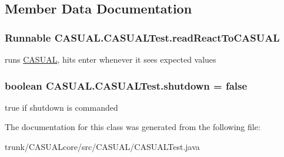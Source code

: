 \subsection{Member Data Documentation}
\hypertarget{class_c_a_s_u_a_l_1_1_c_a_s_u_a_l_test_a96c1d034054c2e980ed6e32da5ac04f5}{
\subsubsection[{read\-React\-To\-C\-A\-S\-U\-A\-L}]{\setlength{\rightskip}{0pt plus 5cm}Runnable C\-A\-S\-U\-A\-L.\-C\-A\-S\-U\-A\-L\-Test.\-read\-React\-To\-C\-A\-S\-U\-A\-L}}\label{class_c_a_s_u_a_l_1_1_c_a_s_u_a_l_test_a96c1d034054c2e980ed6e32da5ac04f5}
runs \hyperlink{namespace_c_a_s_u_a_l}{C\-A\-S\-U\-A\-L}, hits enter whenever it sees expected values \hypertarget{class_c_a_s_u_a_l_1_1_c_a_s_u_a_l_test_a3d022b59ea55fa0e2282e38fbd3eb102}{
\subsubsection[{shutdown}]{\setlength{\rightskip}{0pt plus 5cm}boolean C\-A\-S\-U\-A\-L.\-C\-A\-S\-U\-A\-L\-Test.\-shutdown = false\hspace{0.3cm}{\ttfamily [static]}}}\label{class_c_a_s_u_a_l_1_1_c_a_s_u_a_l_test_a3d022b59ea55fa0e2282e38fbd3eb102}
true if shutdown is commanded 

The documentation for this class was generated from the following file\-:\begin{DoxyCompactItemize}
\item 
trunk/\-C\-A\-S\-U\-A\-Lcore/src/\-C\-A\-S\-U\-A\-L/C\-A\-S\-U\-A\-L\-Test.\-java\end{DoxyCompactItemize}
